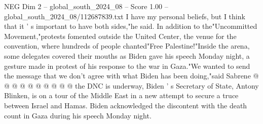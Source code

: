 \begin{textsample}{NEG Dim 2 – global\_south\_2024\_08 – Score 1.00 – global\_south\_2024\_08/112687839.txt}
I have my personal beliefs, but I think that it ' s important to have both sides,"he said.
In addition to the"Uncommitted Movement,"protests fomented outside the United Center, the venue for the convention, where hundreds of people chanted"Free Palestine!"Inside the arena, some delegates covered their mouths as Biden gave his speech Monday night, a gesture made in protest of his response to the war in Gaza."We wanted to send the message that we don't agree with what Biden has been doing,"said Sabrene @ @ @ @ @ @ @ @ @ @ the DNC is underway, Biden ' s Secretary of State, Antony Blinken, is on a tour of the Middle East in a new attempt to secure a truce between Israel and Hamas.
Biden acknowledged the discontent with the death count in Gaza during his speech Monday night.

\end{textsample}
